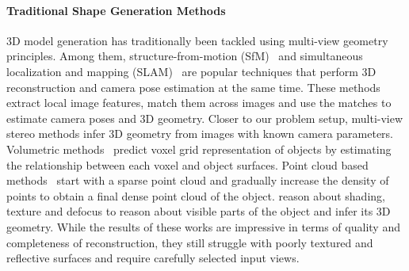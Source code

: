 \paragraph{Traditional Shape Generation Methods}
3D model generation has traditionally been tackled using multi-view geometry principles.
Among them, structure-from-motion (SfM)~\cite{schonberger2016structure,agarwal2011building,cui2015global,cui2017hsfm} and simultaneous localization and mapping (SLAM)~\cite{cadena2016pastslam,mur2015orb,engel2014lsd,whelan2015elasticfusion} are popular techniques that perform 3D reconstruction and camera pose estimation at the same time. These methods extract local image features, match them across images and use the matches to estimate camera poses and 3D geometry.
Closer to our problem setup, multi-view stereo methods infer 3D geometry from images with known camera parameters.
Volumetric methods~\cite{kar2017lsm, kutulakos2000theory, seitz1999photorealistic} predict voxel grid representation of objects by estimating the relationship between each voxel and object surfaces.
Point cloud based methods~\cite{furukawa2009accurate, lhuillier2005quasi} start with a sparse point cloud and
gradually increase the density of points to obtain a final dense point cloud of the object.
\cite{durou2008numerical,zhang1999shape,favaro2005geometric} reason about shading, texture and defocus to reason about visible parts of the object and infer its 3D geometry.
While the results of these works are impressive in terms of quality and completeness of reconstruction, they still struggle with poorly textured and reflective surfaces and require carefully selected input views.

